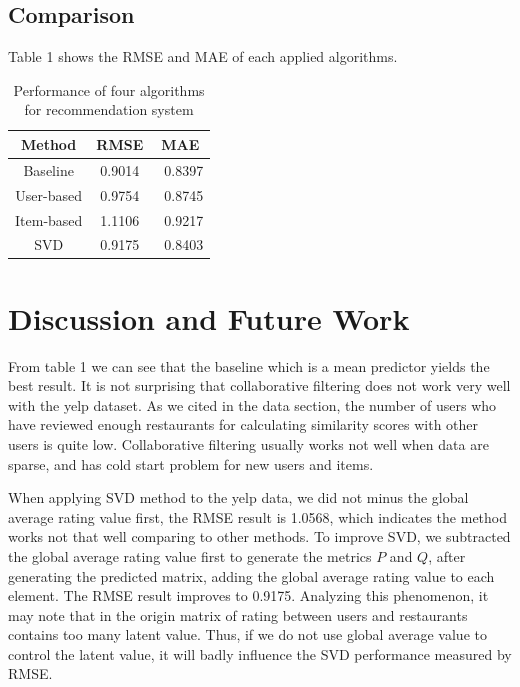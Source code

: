 \documentclass{llncs}
\begin{document}
\subsection{Comparison}
Table 1 shows the RMSE and MAE of each applied algorithms.
\begin{table}
	\caption{Performance of four algorithms for recommendation system}
	\begin{center}
		\begin{tabular}{ccc}
			\hline
				\rule{0pt}{12pt}Method  & \rule{0pt}{12pt}RMSE   &\rule{0pt}{12pt} MAE\\
			\hline\rule{0pt}{12pt}
			Baseline    &   0.9014 & \ 	0.8397 \\
			User-based  &   0.9754 & \ 	0.8745\\
			Item-based  &   1.1106 & \      0.9217\\
			SVD         &   0.9175 & \      0.8403\\
			\hline
		\end{tabular}
	\end{center}
\end{table}

\section{Discussion and Future Work}
From table 1 we can see that the baseline which is a mean predictor yields the best result. It is not surprising that collaborative filtering does not work very well with the yelp dataset. As we cited in the data section, the number of users who have reviewed enough restaurants for calculating similarity scores with other users is quite low. Collaborative filtering usually works not well when data are sparse, and has cold start problem for new users and items.

When applying SVD method to the yelp data, we did not minus the global average rating value first, the RMSE result is 1.0568, which indicates the method works not that well comparing to other methods. To improve SVD, we subtracted the global average rating value first to generate the metrics $P$ and $Q$, after generating the predicted matrix, adding the global average rating value to each element. The RMSE result improves to  0.9175. Analyzing this phenomenon, it may note that in the origin matrix of rating between users and restaurants contains too many latent value. Thus, if we do not use global average value to control the latent value, it will badly influence the SVD performance measured by RMSE.
 
\end{document}
